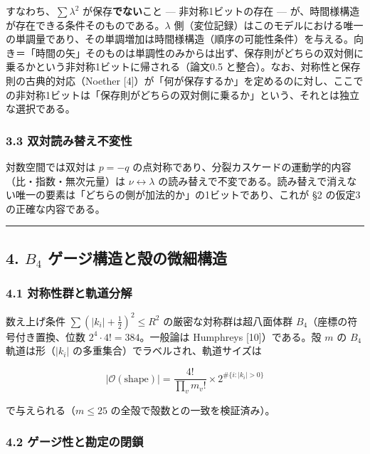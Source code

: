 \documentclass[
]{ltjsarticle}
\begin{document}
すなわち、\(\sum\lambda^2\) が保存\textbf{でない}こと ---
非対称1ビットの存在 ---
が、時間様構造が存在できる条件そのものである。\(\lambda\)
側（変位記録）はこのモデルにおける唯一の単調量であり、その単調増加は時間様構造（順序の可能性条件）を与える。向き＝「時間の矢」そのものは単調性のみからは出ず、保存則がどちらの双対側に乗るかという非対称1ビットに帰される（論文0.5
と整合）。なお、対称性と保存則の古典的対応（Noether
{[}4{]}）が「何が保存するか」を定めるのに対し、ここでの非対称1ビットは「保存則がどちらの双対側に乗るか」という、それとは独立な選択である。

\subsubsection{3.3
双対読み替え不変性}\label{ux53ccux5bfeux8aadux307fux66ffux3048ux4e0dux5909ux6027}

対数空間では双対は \(p=-q\)
の点対称であり、分裂カスケードの運動学的内容（比・指数・無次元量）は
\(\nu\leftrightarrow\lambda\)
の読み替えで不変である。読み替えで消えない唯一の要素は「どちらの側が加法的か」の1ビットであり、これが
§2 の仮定3の正確な内容である。

\begin{center}\rule{0.5\linewidth}{0.5pt}\end{center}

\subsection{\texorpdfstring{4. \(B_4\)
ゲージ構造と殻の微細構造}{4. B\_4 ゲージ構造と殻の微細構造}}\label{b_4-ux30b2ux30fcux30b8ux69cbux9020ux3068ux6bbbux306eux5faeux7d30ux69cbux9020}

\subsubsection{4.1
対称性群と軌道分解}\label{ux5bfeux79f0ux6027ux7fa4ux3068ux8eccux9053ux5206ux89e3}

数え上げ条件 \(\sum(|k_i|+\tfrac12)^2\le R^2\)
の厳密な対称群は超八面体群 \(B_4\)（座標の符号付き置換、位数
\(2^4\cdot4!=384\)。一般論は Humphreys {[}10{]}）である。殻 \(m\) の
\(B_4\) 軌道は形（\(|k_i|\) の多重集合）でラベルされ、軌道サイズは

\[
|\mathcal{O}(\text{shape})|=\frac{4!}{\prod_v m_v!}\times 2^{\#\{i:|k_i|>0\}}
\]

で与えられる（\(m\le25\) の全殻で殻数との一致を検証済み）。

\subsubsection{4.2
ゲージ性と勘定の閉鎖}\label{ux30b2ux30fcux30b8ux6027ux3068ux52d8ux5b9aux306eux9589ux9396}
\end{document}
